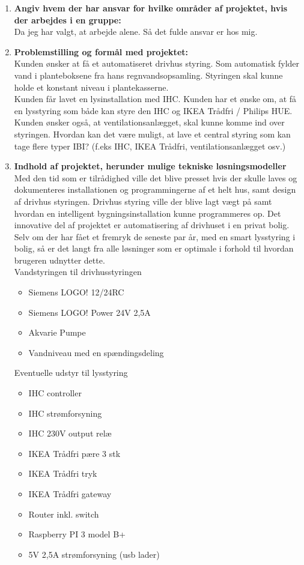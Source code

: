 \begin{enumerate}
    \item \textbf{Angiv hvem der har ansvar for hvilke områder af projektet, hvis der arbejdes i en
    gruppe:}\\ Da jeg har valgt, at arbejde alene. Så det fulde ansvar er hos mig.
    \item \textbf{Problemstilling og formål med projektet:} \\ 
    Kunden ønsker at få et automatiseret drivhus styring. Som
    automatisk fylder vand i planteboksene fra hans regnvandsopsamling.
    Styringen skal kunne holde et konstant niveau i plantekasserne. \\
    Kunden får lavet en lysinstallation med IHC. 
    Kunden har et ønske om, at få en lysstyring som både kan styre den IHC og
    IKEA Trådfri / Philips HUE. 
    \\
    Kunden ønsker også, at ventilationsanlægget, skal kunne komme ind over styringen.
    Hvordan kan det være muligt, at lave et central styring som kan tage flere typer IBI? (f.eks IHC, IKEA Trådfri, ventilationsanlægget osv.)

    \item \textbf{Indhold af projektet, herunder mulige tekniske løsningsmodeller} \\ 
    Med den tid som er tilrådighed ville det blive presset hvis der skulle laves og dokumenteres installationen og programmingerne af et helt hus, samt design af drivhus styringen. 
    Drivhus styring ville der blive lagt vægt på samt hvordan en intelligent bygningsinstallation kunne programmeres op.
    Det innovative del af projektet er automatisering af drivhuset i en privat bolig. Selv om der har fået et fremryk de seneste par år, med en smart lysstyring i bolig, så er det langt fra alle løsninger som er optimale i forhold til hvordan brugeren udnytter dette. 
    \\
    Vandstyringen til drivhusstyringen
    \begin{itemize}
        \item Siemens LOGO! 12/24RC
        \item Siemens LOGO! Power 24V 2,5A
        \item Akvarie Pumpe
        \item Vandniveau med en spændingsdeling
    \end{itemize}
    Eventuelle udstyr til lysstyring
    \begin{itemize}
        \item IHC controller
        \item IHC strømforsyning
        \item IHC 230V output relæ
        \item IKEA Trådfri pære 3 stk
        \item IKEA Trådfri tryk
        \item IKEA Trådfri gateway
        \item Router inkl. switch
        \item Raspberry PI 3 model B+
        \item 5V 2,5A strømforsyning (usb lader)
    \end{itemize}


\end{enumerate}
